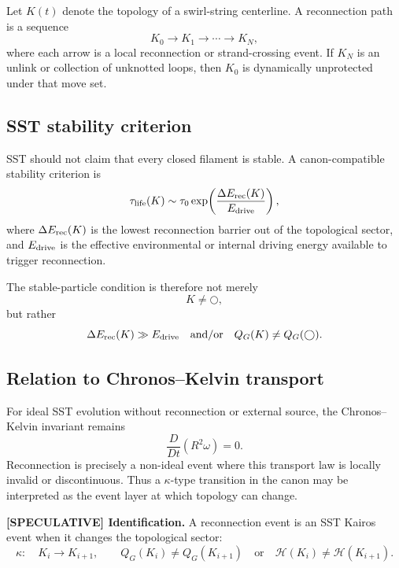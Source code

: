 Let $K(t)$ denote the topology of a swirl-string centerline. A reconnection path is a sequence
\begin{equation}
    K_0 \longrightarrow K_1 \longrightarrow \cdots \longrightarrow K_N,
    \label{eq:reconnection_path}
\end{equation}
where each arrow is a local reconnection or strand-crossing event. If $K_N$ is an unlink or collection of unknotted loops, then $K_0$ is dynamically unprotected under that move set.

\subsection{SST stability criterion}
SST should not claim that every closed filament is stable. A canon-compatible stability criterion is
\begin{equation}
    \tau_{\rm life}(K)
    \sim \tau_0\exp\!\left(\frac{\Delta E_{\rm rec}(K)}{E_{\rm drive}}\right),
    \label{eq:sst_lifetime_barrier}
\end{equation}
where $\Delta E_{\rm rec}(K)$ is the lowest reconnection barrier out of the topological sector, and $E_{\rm drive}$ is the effective environmental or internal driving energy available to trigger reconnection.

The stable-particle condition is therefore not merely
\begin{equation}
    K\neq \bigcirc,
\end{equation}
but rather
\begin{equation}
    \Delta E_{\rm rec}(K)\gg E_{\rm drive}
    \quad\text{and/or}\quad
    Q_G(K)\neq Q_G(\bigcirc).
    \label{eq:sst_stability_condition}
\end{equation}

\subsection{Relation to Chronos--Kelvin transport}
For ideal SST evolution without reconnection or external source, the Chronos--Kelvin invariant remains
\begin{equation}
    \frac{D}{Dt}\left(R^2\omega\right)=0.
\end{equation}
Reconnection is precisely a non-ideal event where this transport law is locally invalid or discontinuous. Thus a $\kappa$-type transition in the canon may be interpreted as the event layer at which topology can change.

\textbf{[SPECULATIVE] Identification.}
A reconnection event is an SST Kairos event when it changes the topological sector:
\begin{equation}
    \kappa:\quad K_i\rightarrow K_{i+1},
    \qquad
    Q_G(K_i)\neq Q_G(K_{i+1})
    \quad\text{or}\quad
    \mathcal H(K_i)\neq \mathcal H(K_{i+1}).
\end{equation}


